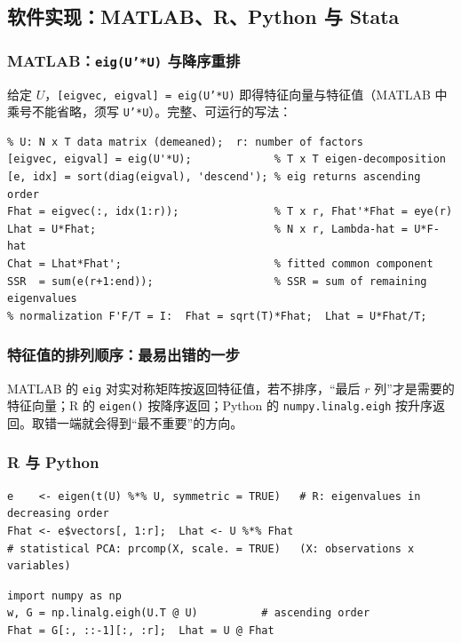 \subsection{软件实现：MATLAB、R、Python 与 Stata}

\subsubsection{MATLAB：{\mdseries\texttt{eig(U'*U)}} 与降序重排}

给定 $U$，\texttt{[eigvec, eigval] = eig(U'*U)} 即得特征向量与特征值（MATLAB 中乘号不能省略，须写 \texttt{U'*U}）。完整、可运行的写法：
\begin{lstlisting}
% U: N x T data matrix (demeaned);  r: number of factors
[eigvec, eigval] = eig(U'*U);             % T x T eigen-decomposition
[e, idx] = sort(diag(eigval), 'descend'); % eig returns ascending order
Fhat = eigvec(:, idx(1:r));               % T x r, Fhat'*Fhat = eye(r)
Lhat = U*Fhat;                            % N x r, Lambda-hat = U*F-hat
Chat = Lhat*Fhat';                        % fitted common component
SSR  = sum(e(r+1:end));                   % SSR = sum of remaining eigenvalues
% normalization F'F/T = I:  Fhat = sqrt(T)*Fhat;  Lhat = U*Fhat/T;
\end{lstlisting}

\subsubsection{特征值的排列顺序：最易出错的一步}

\begin{note}[排序易错点]
MATLAB 的 \texttt{eig} 对实对称矩阵按返回特征值，若不排序，“最后 $r$ 列”才是需要的特征向量；R 的 \texttt{eigen()} 按降序返回；Python 的 \texttt{numpy.linalg.eigh} 按升序返回。取错一端就会得到“最不重要”的方向。
\end{note}

\subsubsection{R 与 Python}

\begin{lstlisting}
e    <- eigen(t(U) %*% U, symmetric = TRUE)   # R: eigenvalues in decreasing order
Fhat <- e$vectors[, 1:r];  Lhat <- U %*% Fhat
# statistical PCA: prcomp(X, scale. = TRUE)   (X: observations x variables)
\end{lstlisting}
\begin{lstlisting}
import numpy as np
w, G = np.linalg.eigh(U.T @ U)          # ascending order
Fhat = G[:, ::-1][:, :r];  Lhat = U @ Fhat
\end{lstlisting}

